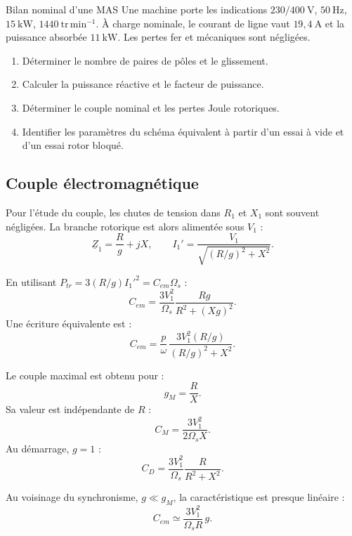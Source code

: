 \begin{TLMachineExercise}{Bilan nominal d'une MAS}
Une machine porte les indications $230/400\ \mathrm V$, $50\ \mathrm{Hz}$, $15\ \mathrm{kW}$, $1440\ \mathrm{tr\,min^{-1}}$. À charge nominale, le courant de ligne vaut $19{,}4\ \mathrm A$ et la puissance absorbée $11\ \mathrm{kW}$. Les pertes fer et mécaniques sont négligées.
\begin{enumerate}
  \item Déterminer le nombre de paires de pôles et le glissement.
  \item Calculer la puissance réactive et le facteur de puissance.
  \item Déterminer le couple nominal et les pertes Joule rotoriques.
  \item Identifier les paramètres du schéma équivalent à partir d'un essai à vide et d'un essai rotor bloqué.
\end{enumerate}
\end{TLMachineExercise}

\subsection{Couple électromagnétique}

Pour l'étude du couple, les chutes de tension dans $R_1$ et $X_1$ sont souvent négligées. La branche rotorique est alors alimentée sous $V_1$ :
\[
\underline Z_1=\frac{R}{g}+jX,
\qquad
I_1'=\frac{V_1}{\sqrt{(R/g)^2+X^2}}.
\]

En utilisant $P_{tr}=3(R/g){I_1'}^2=C_{em}\Omega_s$ :
\[
\boxed{C_{em}=\frac{3V_1^2}{\Omega_s}\frac{Rg}{R^2+(Xg)^2}.}
\]
Une écriture équivalente est :
\[
C_{em}=\frac{p}{\omega}\,
\frac{3V_1^2(R/g)}{(R/g)^2+X^2}.
\]

\begin{center}\TLCoupleGlissementMAS\end{center}

Le couple maximal est obtenu pour :
\[
\boxed{g_M=\frac{R}{X}.}
\]
Sa valeur est indépendante de $R$ :
\[
\boxed{C_M=\frac{3V_1^2}{2\Omega_sX}.}
\]
Au démarrage, $g=1$ :
\[
\boxed{C_D=\frac{3V_1^2}{\Omega_s}\frac{R}{R^2+X^2}.}
\]

Au voisinage du synchronisme, $g\ll g_M$, la caractéristique est presque linéaire :
\[
\boxed{C_{em}\simeq\frac{3V_1^2}{\Omega_sR}\,g.}
\]

